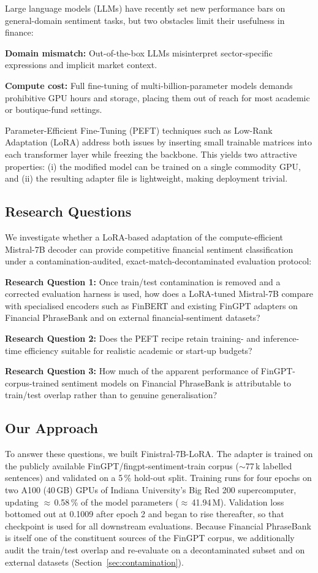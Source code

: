 \documentclass[a4paper]{article}
\begin{document}
Large language models (LLMs) have recently set new performance bars on general-domain sentiment tasks, but two obstacles limit their usefulness in finance:

\textbf{Domain mismatch:} Out-of-the-box LLMs misinterpret sector-specific expressions and implicit market context.

\textbf{Compute cost:} Full fine-tuning of multi-billion-parameter models demands prohibitive GPU hours and storage, placing them out of reach for most academic or boutique-fund settings.

Parameter-Efficient Fine-Tuning (PEFT) techniques such as Low-Rank Adaptation (LoRA) \cite{hu2022} address both issues by inserting small trainable matrices into each transformer layer while freezing the backbone. This yields two attractive properties: (i) the modified model can be trained on a single commodity GPU, and (ii) the resulting adapter file is lightweight, making deployment trivial.

\subsection{Research Questions}

We investigate whether a LoRA-based adaptation of the compute-efficient Mistral-7B decoder can provide competitive financial sentiment classification under a contamination-audited, exact-match-decontaminated evaluation protocol:

\textbf{Research Question 1:} Once train/test contamination is removed and a corrected evaluation harness is used, how does a LoRA-tuned Mistral-7B compare with specialised encoders such as FinBERT and existing FinGPT adapters on Financial PhraseBank and on external financial-sentiment datasets?

\textbf{Research Question 2:} Does the PEFT recipe retain training- and inference-time efficiency suitable for realistic academic or start-up budgets?

\textbf{Research Question 3:} How much of the apparent performance of FinGPT-corpus-trained sentiment models on Financial PhraseBank is attributable to train/test overlap rather than to genuine generalisation?

\subsection{Our Approach}

To answer these questions, we built Finistral-7B-LoRA. The adapter is trained on the publicly available FinGPT/fingpt-sentiment-train corpus (${\sim}$77\,k labelled sentences) and validated on a 5\,\% hold-out split. Training runs for four epochs on two A100 (40\,GB) GPUs of Indiana University's Big Red 200 supercomputer, updating $\approx$\,0.58\,\% of the model parameters ($\approx$\,41.94\,M). Validation loss bottomed out at 0.1009 after epoch 2 and began to rise thereafter, so that checkpoint is used for all downstream evaluations. Because Financial PhraseBank is itself one of the constituent sources of the FinGPT corpus, we additionally audit the train/test overlap and re-evaluate on a decontaminated subset and on external datasets (Section~\ref{sec:contamination}).
\end{document}
